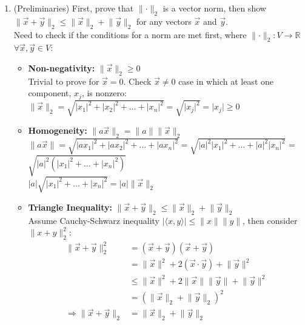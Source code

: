 \documentclass[10pt]{article}
\newcommand{\norm}[1]{\lVert#1\rVert}
\newcommand{\abs}[1]{\lvert#1\rvert}
\begin{document}
\begin{enumerate}
\item (Preliminaries) First, prove that $\norm{\cdot}_2$ is a vector norm, then show $\norm{\vec{x} + \vec{y}}_2 \leq \norm{\vec{x}}_2 + \norm{\vec{y}}_2$ for any vectors $\vec{x}$ and $\vec{y}$. \\
	Need to check if the conditions for a norm are met first, where $\norm{\cdot}_2 : V \rightarrow \mathbb{R}$   $\forall \vec{x},\vec{y} \in V$:
	\begin{itemize}
		\item \textbf{Non-negativity:} $\norm{\vec{x}}_2 \geq 0$ \\
							Trivial to prove for $\vec{x} = 0$. Check $\vec{x} \neq 0$ case in which at least one component, $x_j$, is nonzero: \\
							$\norm{\vec{x}}_2 = \sqrt{\abs{x_1}^2 + \abs{x_2}^2 + \ldots + \abs{x_n}^2} = \sqrt{\abs{x_j}^2} = \abs{x_j} \geq 0 $
		\item \textbf{Homogeneity:} $\norm{a\vec{x}}_2 = \norm{a} \norm{\vec{x}}_2$ \\
							$\norm{a\vec{x}} = \sqrt{\abs{ax_1}^2 + \abs{ax_2}^2 + \ldots + \abs{ax_n}^2} = \sqrt{\abs{a}^2\abs{x_1}^2 + \ldots + \abs{a}									^2\abs{x_n}^2}$ = $\sqrt{\abs{a}^2(\abs{x_1}^2 + \ldots + \abs{x_n}^2)}$ \\
							$\abs{a}\sqrt{\abs{x_1}^2 + \ldots + \abs{x_n}^2} = \abs{a}\norm{\vec{x}}_2$
		\item \textbf{Triangle Inequality:} $\norm{\vec{x} + \vec{y}}_2 \leq \norm{\vec{x}}_2 + \norm{\vec{y}}_2$ \\
							 Assume Cauchy-Schwarz inequality $\abs{\langle x,y \rangle} \leq \norm{x}\norm{y}$, then consider $\norm{x + y}_2^2$: \\
							\begin{align*}
						 	\norm{\vec{x} + \vec{y}}_2^2 &= (\vec{x}+ \vec{y})(\vec{x}+ \vec{y}) \\
											     &= \norm{\vec{x}}^2 + 2(\vec{x} \cdot \vec{y}) + \norm{\vec{y}}^2 \\	
				       							     &\leq \norm{\vec{x}}^2 + 2\norm{\vec{x}}\norm{\vec{y}} + \norm{\vec{y}}^2 \\
											     &= \left(\norm{\vec{x}}_2 + \norm{\vec{y}}_2\right)^2 \\
							\Rightarrow \norm{\vec{x} + \vec{y}}_2  &=  \norm{\vec{x}}_2 + \norm{\vec{y}}_2
							\end{align*}
	\end{itemize}
\end{enumerate}
\clearpage %
\end{document}
